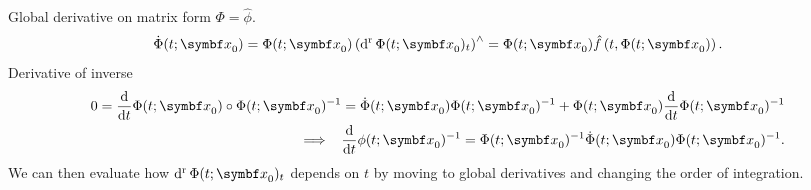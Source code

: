 Global derivative on matrix form $\Phi = \hat \phi$.
\begin{equation}
  \dot \Phi(t; \x_{0}) = \Phi(t; \x_{0}) \left( \dr \Phi(t; \x_{0})_{t} \right )^{\wedge} = \Phi(t; \x_{0})  \hat f\left(t, \Phi(t; \x_{0}) \right).
\end{equation}
Derivative of inverse
\begin{equation}
  \begin{aligned}
    0 = \frac{\mathrm{d}}{\mathrm{d}t} \Phi(t; \x_{0}) \circ \Phi(t; \x_{0})^{-1} = \dot \Phi(t; \x_{0}) \Phi(t; \x_{0})^{-1} + \Phi(t; \x_{0}) \frac{\mathrm{d}}{\mathrm{d}t} \Phi(t; \x_{0})^{-1} \\
    \implies \; \; \frac{\mathrm{d}}{\mathrm{d}t} \phi(t; \x_{0})^{-1} = \Phi(t; \x_{0})^{-1} \dot \Phi(t; \x_{0}) \Phi(t; \x_{0})^{-1}.
  \end{aligned}
\end{equation}
We can then evaluate how $\dr \Phi(t; \x_{0})_{t}$ depends on $t$ by moving to global derivatives and changing the order of integration.
